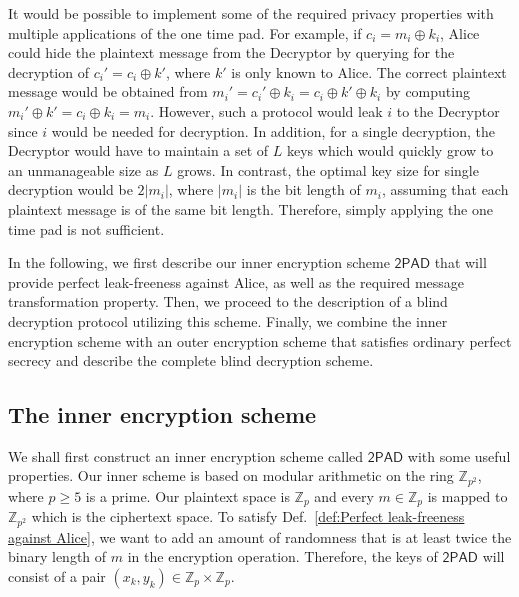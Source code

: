 \documentclass[10pt,journal]{IEEEtran}
\newcommand{\Z}{\mathbb{Z}}
\newcommand{\sch}[1]{\mathsf{#1}}
\begin{document}
It would be possible to implement some of the required privacy properties
with multiple applications of the one time pad.
For example, if $c_i = m_i \oplus k_i$, Alice could hide
the plaintext message from the Decryptor by querying for the decryption of $c_i' = c_i \oplus k'$, where $k'$ is only known to Alice.
The correct plaintext message would be obtained from $m_i' = c_i' \oplus k_i = c_i \oplus k' \oplus k_i$
by computing $m_i' \oplus k' = c_i \oplus k_i = m_i$.
However, such a protocol would leak $i$ to the Decryptor since $i$ would be needed for decryption. In addition,
for a single decryption, the Decryptor would have to maintain a set of $L$
keys which would quickly grow to an unmanageable size as $L$ grows.
In contrast, the optimal key size for single decryption would be $2|m_i|$, where $|m_i|$ is
the bit length of $m_i$, assuming that each
plaintext message is of the same bit length.
Therefore, simply applying the one time pad is not sufficient.





In the following, we first describe our inner encryption scheme $\sch{2PAD}$ that will provide perfect leak-freeness against Alice,
as well as the required message transformation property.
Then, we proceed to the description of a blind decryption protocol utilizing this scheme. 
Finally, we combine the inner encryption scheme with an outer encryption scheme that satisfies
ordinary perfect secrecy and describe the complete blind decryption scheme.

\subsection{The inner encryption scheme}

We shall first construct an inner encryption scheme called $\sch{2PAD}$
with some useful properties.
Our inner scheme is based on modular arithmetic on the ring $\Z_{p^2}$, where $p \geq 5$
is a prime. Our plaintext space is $\Z_{p}$ and every $m \in \Z_{p}$ is mapped to 
$\Z_{p^2}$ which is the ciphertext space.
To satisfy Def.~\ref{def:Perfect leak-freeness against Alice}, we want to add an amount
of randomness that is at least twice the binary length of $m$ in the encryption operation.
Therefore, the keys of $\sch{2PAD}$ will consist of a pair $(x_k,y_k) \in \Z_p \times \Z_p$.
\end{document}
